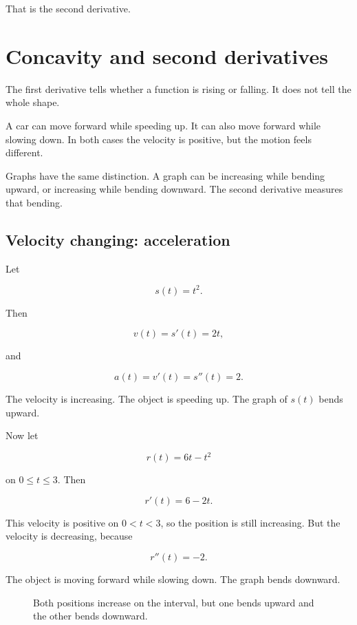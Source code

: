 That is the second derivative.

\section{Concavity and second derivatives}
\label{sec:concavity-second-derivatives}

The first derivative tells whether a function is rising or falling.  It does not tell the
whole shape.

A car can move forward while speeding up.  It can also move forward while slowing
down.  In both cases the velocity is positive, but the motion feels different.

Graphs have the same distinction.  A graph can be increasing while bending upward,
or increasing while bending downward.  The second derivative measures that bending.

\subsection{Velocity changing: acceleration}
\label{subsec:velocity-changing-acceleration}

Let

\[
s(t)=t^2.
\]

Then

\[
v(t)=s'(t)=2t,
\]

and

\[
a(t)=v'(t)=s''(t)=2.
\]

The velocity is increasing.  The object is speeding up.  The graph of \(s(t)\) bends
upward.

Now let

\[
r(t)=6t-t^2
\]

on \(0\le t\le 3\).  Then

\[
r'(t)=6-2t.
\]

This velocity is positive on \(0<t<3\), so the position is still increasing.  But the
velocity is decreasing, because

\[
r''(t)=-2.
\]

The object is moving forward while slowing down.  The graph bends downward.

\begin{figure}[h]
\centering
{}
\caption{Both positions increase on the interval, but one bends upward and the other bends downward.}
\label{fig:increasing-different-concavity}
\end{figure}

